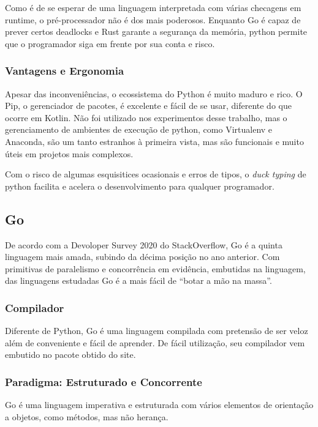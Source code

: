 \documentclass[12pt,a4paper]{article}
\begin{document}
Como é de se esperar de uma linguagem interpretada com várias checagens em runtime, o pré-processador não é dos mais poderosos. Enquanto Go é capaz de prever certos deadlocks e Rust garante a segurança da memória, python permite que o programador siga em frente por sua conta e risco.

\subsubsection{Vantagens e Ergonomia}
\label{sssec:python vantagens}

Apesar das inconveniências, o ecossistema do Python é muito maduro e rico. O Pip, o gerenciador de pacotes, é excelente e fácil de se usar, diferente do que ocorre em Kotlin. Não foi utilizado nos experimentos desse trabalho, mas o gerenciamento de ambientes de execução de python, como Virtualenv e Anaconda, são um tanto estranhos à primeira vista, mas são funcionais e muito úteis em projetos mais complexos.

Com o risco de algumas esquisitices ocasionais e erros de tipos, o \emph{duck typing} de python facilita e acelera o desenvolvimento para qualquer programador.

\subsection{Go}
\label{ssec:go}

De acordo com a Devoloper Survey 2020 do StackOverflow, Go é a quinta linguagem mais amada, subindo da décima posição no ano anterior. Com primitivas de paralelismo e concorrência em evidência, embutidas na linguagem, das linguagens estudadas Go é a mais fácil de ``botar a mão na massa''.

\subsubsection{Compilador}
\label{sssec:go compilador}

Diferente de Python, Go é uma linguagem compilada com pretensão de ser veloz além de conveniente e fácil de aprender. De fácil utilização, seu compilador vem embutido no pacote obtido do site.

\subsubsection{Paradigma: Estruturado e Concorrente}
\label{sssec:go paradigma}

Go é uma linguagem imperativa e estruturada com vários elementos de orientação a objetos, como métodos, mas não herança.
\end{document}
